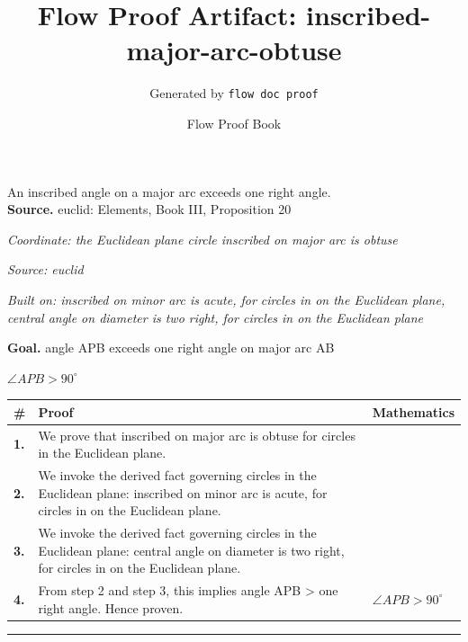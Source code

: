 \documentclass[11pt]{article}
\title{Flow Proof Artifact: inscribed-major-arc-obtuse}
\author{Generated by \texttt{flow doc proof}}
\date{Flow Proof Book}
\theoremstyle{definition}
\begin{document}
\maketitle
An inscribed angle on a major arc exceeds one right angle.\\[0.5em]
\textbf{Source.} euclid: Elements, Book III, Proposition 20\\[0.5em]
\bigskip
{}\par
\smallskip\noindent\textit{Coordinate: the Euclidean plane \cdot circle \cdot inscribed on major arc is obtuse}\par
\smallskip\noindent\textit{Source: euclid}\par
\smallskip\noindent\textit{Built on: inscribed on minor arc is acute, for circles in on the Euclidean plane, central angle on diameter is two right, for circles in on the Euclidean plane}\par
\medskip
\noindent\textbf{Goal.} angle APB exceeds one right angle on major arc AB\par
\noindent$\displaystyle \angle APB > 90^\circ$\par
\medskip
\noindent
\begin{tabular}{@{} >{\raggedright\arraybackslash}p{} >{\raggedright\arraybackslash}p{} >{\raggedleft\arraybackslash}p{} @{}}
\textbf{\#} & \textbf{Proof} & \textbf{Mathematics} \\
\midrule
\textbf{1.} & We prove that inscribed on major arc is obtuse for circles in the Euclidean plane. & \\[0.45em]
\textbf{2.} & We invoke the derived fact governing circles in the Euclidean plane: inscribed on minor arc is acute, for circles in on the Euclidean plane. & \\[0.45em]
\textbf{3.} & We invoke the derived fact governing circles in the Euclidean plane: central angle on diameter is two right, for circles in on the Euclidean plane. & \\[0.45em]
\textbf{4.} & From step 2 and step 3, this implies angle APB > one right angle. Hence proven. & $\displaystyle \angle APB > 90^\circ$ \\[0.45em]
\bottomrule
\end{tabular}
\label{thm:Geometry-circle-inscribed_on_major_arc_is_obtuse}
\par\medskip\hrule
\end{document}
